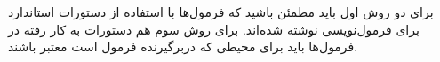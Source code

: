 % 


\begin{note}
برای دو روش اول باید مطمئن باشید که فرمول‌ها با استفاده از دستورات استاندارد
\lr{\LaTeX} برای فرمول‌نویسی نوشته شده‌اند. برای روش سوم هم دستورات به کار رفته
در فرمول‌ها باید برای محیطی که دربرگیرنده فرمول است معتبر باشند.
\end{note}
